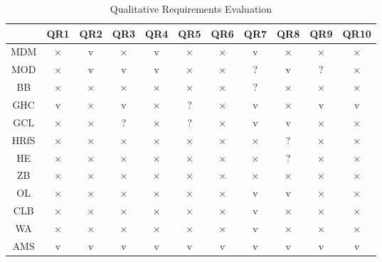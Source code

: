\begin{table}[H]
    \centering
    \bgroup
    \def\arraystretch{1.5}
    \begin{tabular}{|c|c|c|c|c|c|c|c|c|c|c|}
    \hline
         & QR1 & QR2 & QR3 & QR4 & QR5 & QR6 & QR7 & QR8 & QR9 & QR10 \\ \hline
        MDM & × & v & × & v & × & × & v & × & × & × \\ \hline
        MOD & × & v & v & v & × & × & ? & v & ? & × \\ \hline
        BB & × & × & × & × & × & × & ? & × & × & × \\ \hline
        GHC & v & × & v & × & ? & × & v & × & v & v \\ \hline
        GCL & × & × & ? & × & ? & × & v & v & × & × \\ \hline
        HRfS & × & × & × & × & × & × & × & ? & × & × \\ \hline
        HE & × & × & × & × & × & × & × & ? & × & × \\ \hline
        ZB & × & × & × & × & × & × & × & × & × & × \\ \hline
        OL & × & × & × & × & × & × & v & v & × & × \\ \hline
        CLB & × & × & × & × & × & × & v & × & × & × \\ \hline
        WA & × & × & × & × & × & × & v & × & × & × \\ \hline
        AMS & v & v & v & v & v & v & v & v & v & v \\ \hline
    \end{tabular}
    \egroup
    \caption{Qualitative Requirements Evaluation}
\end{table}

